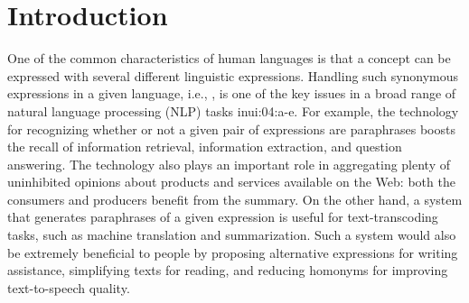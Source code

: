 \documentclass[english]{jnlp_1.4}
\renewcommand{\cite}{}
\renewcommand{\emph}[1]{}
\begin{document}
\maketitle


\section{Introduction}
\label{sec:intro}

One of the common characteristics of human languages is that a concept
can be expressed with several different linguistic expressions.
Handling such synonymous expressions in a given language, i.e.,
\emph{paraphrases}, is one of the key issues in a broad range of
natural language processing (NLP) tasks \cite{inui:04:a-e}.
For example, the technology for recognizing whether or not a given
pair of expressions are paraphrases boosts the recall of information
retrieval, information extraction, and question answering.  The
technology also plays an important role in aggregating plenty of
uninhibited opinions about products and services available on the Web:
both the consumers and producers benefit from the summary.
On the other hand, a system that generates paraphrases of a given
expression is useful for text-transcoding tasks, such as machine
translation and summarization.  Such a system would also be extremely
beneficial to people by proposing alternative expressions for writing
assistance, simplifying texts for reading, and reducing homonyms for
improving text-to-speech quality.
\end{document}
